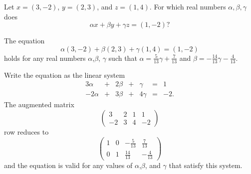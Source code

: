 \documentclass{article}
\begin{document}
\begin{exercise}
\begin{solution}
\end{solution}
\end{exercise}





\problemlabel

\begin{exercise} \label{c4.3.5}
Let $x=(3,-2)$, $y=(2,3)$, and $z=(1,4)$.  For which real
numbers $\alpha,\beta,\gamma$ does
\[
\alpha x + \beta y + \gamma z = (1,-2)?
\]

\begin{solution}

\ans The equation
\[ \alpha(3,-2) + \beta(2,3) + \gamma(1,4) = (1,-2) \]
holds for any real numbers $\alpha$,$\beta$,
$\gamma$ such that $\alpha = \frac{5}{13}\gamma +
\frac{7}{13}$ and $\beta = -\frac{14}{13}\gamma
- \frac{4}{13}$.

\soln Write the equation as the linear system
\[ \begin{array}{rrrrrrl}
3\alpha & + & 2\beta & + & \gamma & = & 1 \\
-2\alpha & + & 3\beta & + & 4\gamma & = & -2. \end{array} \]
The augmented matrix
\[ \left(\begin{array}{rrr|r}
3 & 2 & 1 & 1 \\
-2 & 3 & 4 & -2 \end{array}\right) \]
row reduces to
\[ \left(\begin{array}{rrr|r}
1 & 0 & -\frac{5}{13} & \frac{7}{13} \\
0 & 1 & \frac{14}{13} & -\frac{4}{13} \end{array}\right) \]
and the equation is valid for any values of $\alpha$,$\beta$,
and $\gamma$ that satisfy this system.

\end{solution}
\end{exercise}





\problemlabel
\end{document}
